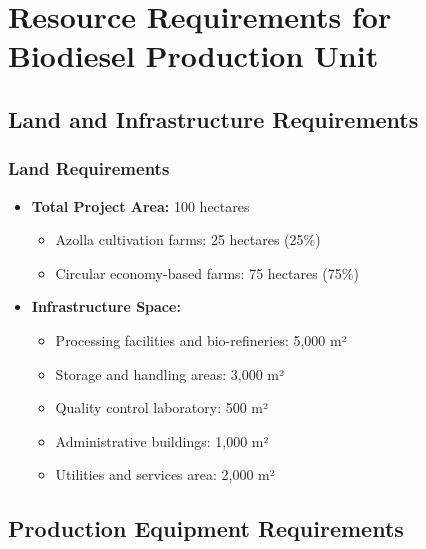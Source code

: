 \section{Resource Requirements for Biodiesel Production Unit}

\subsection{Land and Infrastructure Requirements}

\subsubsection{Land Requirements}
\begin{itemize}
    \item \textbf{Total Project Area:} 100 hectares
    \begin{itemize}
        \item Azolla cultivation farms: 25 hectares (25\%)
        \item Circular economy-based farms: 75 hectares (75\%)
    \end{itemize}
    
    \item \textbf{Infrastructure Space:}
    \begin{itemize}
        \item Processing facilities and bio-refineries: 5,000 m²
        \item Storage and handling areas: 3,000 m²
        \item Quality control laboratory: 500 m²
        \item Administrative buildings: 1,000 m²
        \item Utilities and services area: 2,000 m²
    \end{itemize}
\end{itemize}

\subsection{Production Equipment Requirements}

